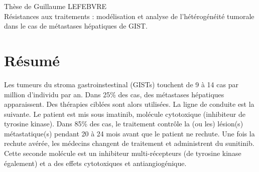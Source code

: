 \documentclass[12pt,a4paper]{article}
\newcommand{\hetero}{hétérogénéité\xspace}
\begin{document}
\begin{center}
\large
Thèse de Guillaume LEFEBVRE \\
\Large
Résistances aux traitements : modélisation et analyse de l'\hetero tumorale dans le cas de métastases hépatiques de GIST. 
\end{center}

\section*{Résumé}
Les tumeurs du stroma gastroinstestinal (GISTs) touchent de 9 à 14 cas par million d'individu par an. Dans 25\% des cas, des métastases hépatiques apparaissent. 
Des thérapies ciblées sont alors utilisées. La ligne de conduite est la suivante. Le patient est mis sous imatinib, molécule cytotoxique (inhibiteur de tyrosine kinase). Dans 85\% des cas, le traitement contrôle la (ou les) lésion(s) métastatique(s) pendant 20 à 24 mois avant que le patient ne rechute. Une fois la rechute avérée, les médecins changent de traitement et administrent du sunitinib. Cette seconde molécule est un inhibiteur multi-récepteurs (de tyrosine kinase également) et a des effets cytotoxiques et antiangiogénique. 
\end{document}

